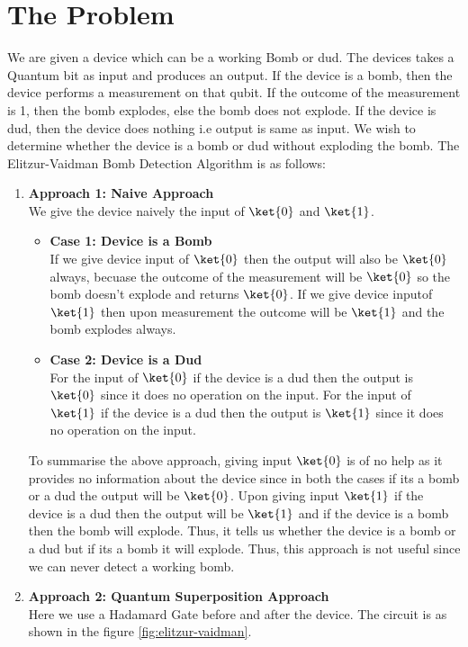 \documentclass[12pt, oneside]{book}
\theoremstyle{definition}
\theoremstyle{definition}
\theoremstyle{remark}
\begin{document}
\section{The Problem}
We are given a device which can be a working Bomb or dud. The devices takes a Quantum bit as input and produces an output.
If the device is a bomb, then the device performs a measurement on that qubit. If the outcome of the measurement is 1, then the bomb explodes, else the bomb does not explode.
If the device is dud, then the device does nothing i.e output is same as input.
We wish to determine whether the device is a bomb or dud without exploding the bomb. The Elitzur-Vaidman Bomb Detection Algorithm is as follows:
\begin{enumerate}
    \item \textbf{Approach 1: Naive Approach }\\We give the device naively the input of $\ket{0}$ and $\ket{1}$. 
    \begin{itemize} 
        \item \textbf{Case 1: Device is a Bomb}\\
        If we give device input of $\ket{0}$ then the output will also be $\ket{0}$ always, becuase the outcome of the measurement will be $\ket{0}$ so the bomb doesn't explode and returns $\ket{0}$. 
        If we give device inputof $\ket{1}$ then upon measurement the outcome will be $\ket{1}$ and the bomb explodes always.
        \item \textbf{Case 2: Device is a Dud}\\
        For the input of $\ket{0}$ if the device is a dud then the output is $\ket{0}$ since it does no operation on the input.
        For the input of $\ket{1}$ if the device is a dud then the output is $\ket{1}$ since it does no operation on the input.
    \end{itemize}
    To summarise the above approach, giving input $\ket{0}$ is of no help as it provides no information about the device since in both the cases if its a bomb or a dud the output will be $\ket{0}$. 
    Upon giving input $\ket{1}$ if the device is a dud then the output will be $\ket{1}$ and if the device is a bomb then the bomb will explode. Thus, it tells us whether the device is a bomb or a dud but if its a bomb it will explode. Thus, this approach is not useful since we can never detect a working bomb.
    \item \textbf{Approach 2: Quantum Superposition Approach}\\
    Here we use a Hadamard Gate before and after the device. The circuit is as shown in the figure \ref{fig:elitzur-vaidman}.

\end{enumerate}
\end{document}
